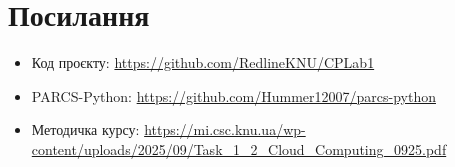 \documentclass[12pt,a4paper]{article}
\begin{document}
\section*{Посилання}

\begin{itemize}
    \item Код проєкту: \url{https://github.com/RedlineKNU/CPLab1}
    \item PARCS-Python: \url{https://github.com/Hummer12007/parcs-python}
    \item Методичка курсу: \url{https://mi.csc.knu.ua/wp-content/uploads/2025/09/Task_1_2_Cloud_Computing_0925.pdf}
\end{itemize}
\end{document}
